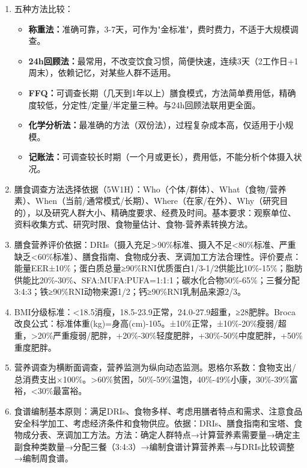 {\begin{enumerate}[leftmargin=*, itemsep=5pt]
    \item 五种方法比较：
    \begin{itemize}
        \item \textbf{称重法：}准确可靠，3-7天，可作为"金标准"，费时费力，不适于大规模调查。
        \item \textbf{24h回顾法：}最常用，不改变饮食习惯，简便快速，连续3天（2工作日+1周末），依赖记忆，对某些人群不适用。
        \item \textbf{FFQ：}可调查长期（几天到1年以上）膳食模式，方法简单费用低，精确度较低，分定性/定量/半定量三种。与24h回顾法联用更全面。
        \item \textbf{化学分析法：}最准确的方法（双份法），过程复杂成本高，仅适用于小规模。
        \item \textbf{记账法：}可调查较长时期（一个月或更长），费用低，不能分析个体摄入状况。
    \end{itemize}

    \item 膳食调查方法选择依据（5W1H）：Who（个体/群体）、What（食物/营养素）、When（当前/通常模式/长期）、Where（在家/在外）、Why（研究目的），以及研究人群大小、精确度要求、经费及时间。基本要求：观察单位、资料收集方式、研究时限、食物量估计、食物-营养素转换方法。

    \item 膳食营养评价依据：DRIs（摄入充足>90\%标准、摄入不足<80\%标准、严重缺乏<60\%标准）、膳食指南、食物成分表、烹调加工方法合理性。评价要点：能量EER±10\%；蛋白质总量≥90\%RNI优质蛋白1/3-1/2供能比10\%-15\%；脂肪供能比20\%-30\%、SFA:MUFA:PUFA=1:1:1；碳水化合物50\%-65\%；三餐分配3:4:3；铁≥90\%RNI动物来源1/2；钙≥90\%RNI乳制品来源2/3。

    \item BMI分级标准：<18.5消瘦，18.5-23.9正常，24.0-27.9超重，≥28肥胖。Broca改良公式：标准体重(kg)=身高(cm)-105。±10\%正常，±10\%-20\%瘦弱/超重，>20\%严重瘦弱/肥胖，+20\%-30\%轻度肥胖，+30\%-50\%中度肥胖，+50\%重度肥胖。

    \item 营养调查为横断面调查，营养监测为纵向动态监测。恩格尔系数：食物支出/总消费支出×100\%。>60\%贫困，50\%-59\%温饱，40\%-49\%小康，30\%-39\%富裕，<30\%最富裕。

    \item 食谱编制基本原则：满足DRIs、食物多样、考虑用膳者特点和需求、注意食品安全科学加工、考虑经济条件和食物供应。依据：DRIs、膳食指南和宝塔、食物成分表、烹调加工方法。方法：确定人群特点→计算营养素需要量→确定主副食种类数量→分配三餐（3:4:3）→编制食谱计算营养素→与DRIs比较调整→编制周食谱。


\end{enumerate}}
